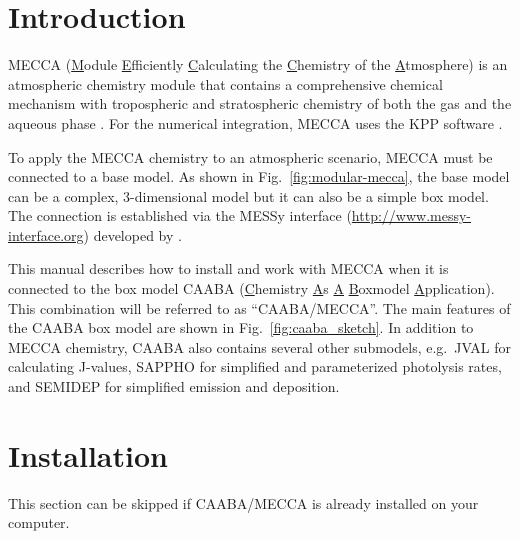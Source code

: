 \documentclass[twoside]{article}
\newcommand{\egcite}[1]{\citep[e.g.][]{#1}}
\begin{document}
\section{Introduction}

MECCA (\underline{M}odule \underline{E}fficiently
\underline{C}alculating the \underline{C}hemistry of the
\underline{A}tmosphere) is an atmospheric chemistry module that contains
a comprehensive chemical mechanism with tropospheric and stratospheric
chemistry of both the gas and the aqueous phase \citep{1666,2405}. For
the numerical integration, MECCA uses the KPP software \citep{1665}.

To apply the MECCA chemistry to an atmospheric scenario, MECCA must be
connected to a base model. As shown in Fig.~\ref{fig:modular-mecca}, the
base model can be a complex, 3-dimensional model \egcite{1851} but it
can also be a simple box model. The connection is established via the
MESSy interface (\url{http://www.messy-interface.org}) developed by
\citet{1664}.

This manual describes how to install and work with MECCA when it is
connected to the box model CAABA (\underline{C}hemistry \underline{A}s
\underline{A} \underline{B}oxmodel \underline{A}pplication). This
combination will be referred to as ``CAABA/MECCA''. The main features of
the CAABA box model are shown in Fig.~\ref{fig:caaba_sketch}. In
addition to MECCA chemistry, CAABA also contains several other
submodels, e.g.\ JVAL for calculating J-values, SAPPHO for simplified
and parameterized photolysis rates, and SEMIDEP for simplified emission
and deposition.

\section{Installation}
\label{sec:install}

This section can be skipped if CAABA/MECCA is already installed on your
computer.
\end{document}
